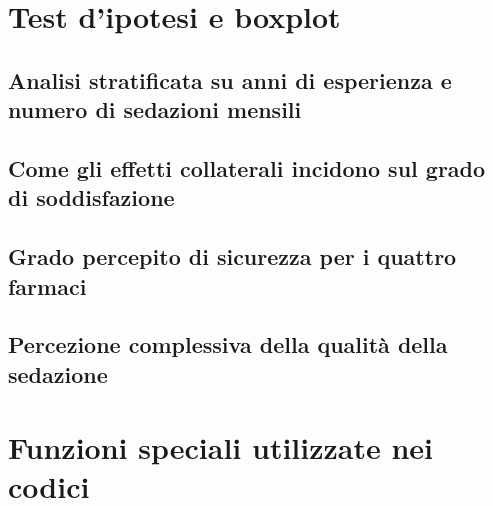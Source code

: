\newpage

\section{Test d'ipotesi e boxplot}

    \subsection{Analisi stratificata su anni di esperienza e numero di sedazioni mensili}
    \label{code:quality-strati}
    
    \newpage

    \subsection{Come gli effetti collaterali incidono sul grado di soddisfazione}
    \label{code:adverse-effects-perception}
    
    \newpage

    \subsection{Grado percepito di sicurezza per i quattro farmaci}
    \label{code:safety}
    
    \newpage

    \subsection{Percezione complessiva della qualità della sedazione}
    \label{code:quality-global}
    
    \newpage

\newpage

\section{Funzioni speciali utilizzate nei codici}
\label{code:subroutines}

    
    \bigskip

    
    \bigskip

    
    \bigskip
